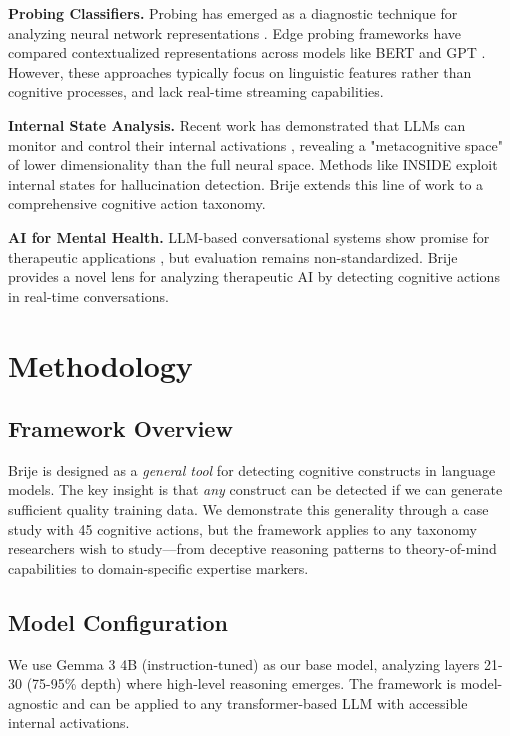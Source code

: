 \documentclass[letterpaper]{article}
\begin{document}
\textbf{Probing Classifiers.} Probing has emerged as a diagnostic technique for analyzing neural network representations \cite{belinkov2021probing}. Edge probing frameworks have compared contextualized representations across models like BERT and GPT \cite{tenney2019bert}. However, these approaches typically focus on linguistic features rather than cognitive processes, and lack real-time streaming capabilities.

\textbf{Internal State Analysis.} Recent work has demonstrated that LLMs can monitor and control their internal activations \cite{metacognitive2025}, revealing a "metacognitive space" of lower dimensionality than the full neural space. Methods like INSIDE \cite{inside2024} exploit internal states for hallucination detection. Brije extends this line of work to a comprehensive cognitive action taxonomy.

\textbf{AI for Mental Health.} LLM-based conversational systems show promise for therapeutic applications \cite{counsellme2024, caiti2024}, but evaluation remains non-standardized. Brije provides a novel lens for analyzing therapeutic AI by detecting cognitive actions in real-time conversations.

\section{Methodology}

\subsection{Framework Overview}

Brije is designed as a \emph{general tool} for detecting cognitive constructs in language models. The key insight is that \emph{any} construct can be detected if we can generate sufficient quality training data. We demonstrate this generality through a case study with 45 cognitive actions, but the framework applies to any taxonomy researchers wish to study—from deceptive reasoning patterns to theory-of-mind capabilities to domain-specific expertise markers.

\subsection{Model Configuration}

We use Gemma 3 4B (instruction-tuned) as our base model, analyzing layers 21-30 (75-95\% depth) where high-level reasoning emerges. The framework is model-agnostic and can be applied to any transformer-based LLM with accessible internal activations.
\end{document}
